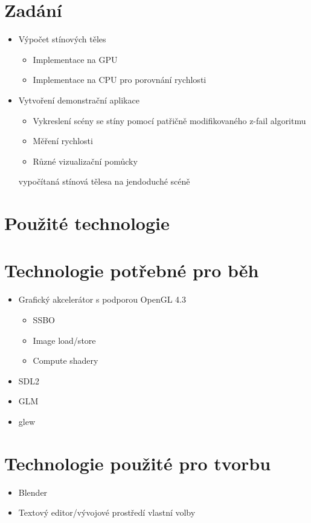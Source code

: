 \documentclass[11pt,a4paper]{article}
\begin{document}
\titlepageandcontents

\section{Zadání}

\begin{itemize}
	\item Výpočet stínových těles
		\begin{itemize}
			\item Implementace na GPU
			\item Implementace na CPU pro porovnání rychlosti
		\end{itemize}
	\item Vytvoření demonstrační aplikace
		\begin{itemize}
			\item Vykreslení scény se stíny pomocí patřičně modifikovaného z-fail algoritmu
			\item Měření rychlosti
			\item Různé vizualizační pomůcky
		\end{itemize} vypočítaná stínová tělesa na jendoduché scéně
\end{itemize}

\section{Použité technologie}

\section{Technologie potřebné pro běh}
\begin{itemize}
	\item Grafický akcelerátor s podporou OpenGL 4.3
		\begin{itemize}
			\item SSBO
			\item Image load/store
			\item Compute shadery
		\end{itemize}
	\item SDL2
	\item GLM
	\item glew
\end{itemize}

\section{Technologie použité pro tvorbu}
\begin{itemize}
	\item Blender
	\item Textový editor/vývojové prostředí vlastní volby
\end{itemize}
\end{document}

